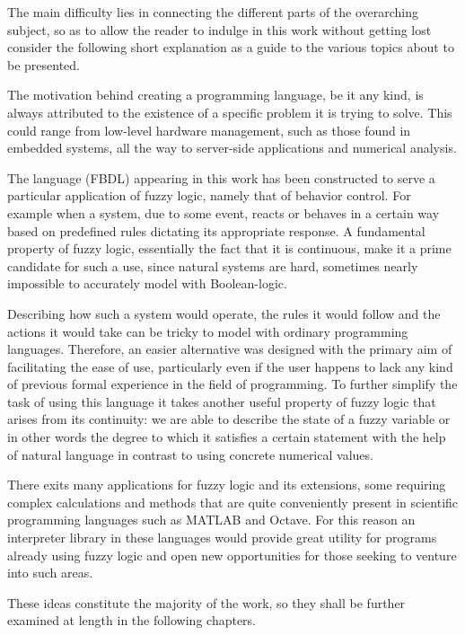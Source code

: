 The main difficulty lies in connecting the different parts of the overarching subject, so as to allow the reader to indulge in this work without getting lost consider the following short explanation as a guide to the various topics about to be presented.

The motivation behind creating a programming language, be it any kind, is always attributed to the existence of a specific problem it is trying to solve. This could range from low-level hardware management, such as those found in embedded systems, all the way to server-side applications and numerical analysis.

The language (FBDL) appearing in this work has been constructed to serve a particular application of fuzzy logic, namely that of behavior control. For example when a system, due to some event, reacts or behaves in a certain way based on predefined rules dictating its appropriate response. A fundamental property of fuzzy logic, essentially the fact that it is continuous, make it a prime candidate for such a use, since natural systems are hard, sometimes nearly impossible to accurately model with Boolean-logic.

Describing how such a system would operate, the rules it would follow and the actions it would take can be tricky to model with ordinary programming languages. Therefore, an easier alternative was designed with the primary aim of facilitating the ease of use, particularly even if the user happens to lack any kind of previous formal experience in the field of programming. To further simplify the task of using this language it takes another useful property of fuzzy logic that arises from its continuity: we are able to describe the state of a fuzzy variable or in other words the degree to which it satisfies a certain statement with the help of natural language in contrast to using concrete numerical values.

There exits many applications for fuzzy logic and its extensions, some requiring complex calculations and methods that are quite conveniently present in scientific programming languages such as MATLAB and Octave. For this reason an interpreter library in these languages would provide great utility for programs already using fuzzy logic and open new opportunities for those seeking to venture into such areas.

These ideas constitute the majority of the work, so they shall be further examined at length in the following chapters.

